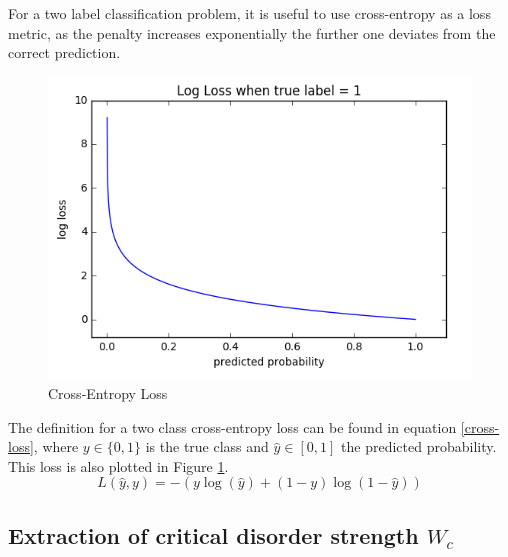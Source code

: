 \documentclass[reprint,amsmath,amssymb,aps,prb]{revtex4-2}
\begin{document}
For a two label classification problem, it is useful to use cross-entropy as a loss metric, as the penalty increases exponentially the further one deviates from the correct prediction.\cite{Goodfellow-et-al-2016}
\begin{figure}[h!]
\centering
\includegraphics[width=\linewidth]{figures/cross_entropy}
\caption{Cross-Entropy Loss}
\label{fig:cross_entropy}
\end{figure}
The definition for a two class cross-entropy loss can be found in equation \ref{cross-loss}, where $y \in \{0,1\}$ is the true class and $\hat{y}\in\left[0,1\right]$ the predicted probability. This loss is also plotted in Figure \ref{fig:cross_entropy}.
\begin{equation}
L(\hat{y}, y)=-\left(y\log(\hat{y})+(1-y)\log(1-\hat{y})\right)\label{cross-loss}
\end{equation}

\subsection{Extraction of critical disorder strength $W_c$}\label{sec:wcextract}
\end{document}
